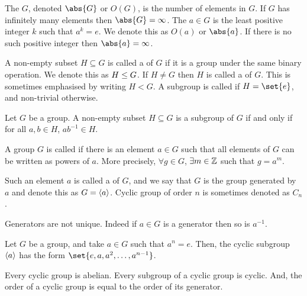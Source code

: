 \documentclass[11pt]{penrose}
\begin{document}
\begin{ndfn}
    The  $G$, denoted $\abs{G}$ or $O(G)$, is the number of elements in $G$. If $G$ has infinitely many elements then $\abs{G} = \infty$. The  $a \in G$ is the least positive integer $k$ such that $a^k = e$. We denote this as $O(a)$ or $\abs{a}$. If there is no such positive integer then $\abs{a} = \infty$.
\end{ndfn}

\begin{ndfn}
    A non-empty subset $H \subseteq G$ is called a  of $G$ if it is a group under the same binary operation. We denote this as $H \mathrel{\leq} G$. If $H \neq G$ then $H$ is called a  of $G$. This is sometimes emphasised by writing $H < G$. A subgroup is called  if $H = \set{e}$, and non-trivial otherwise.
\end{ndfn}

\begin{nthm}
    Let $G$ be a group. A non-empty subset $H \subseteq G$ is a subgroup of $G$ if and only if for all $a, b \in H$, $ab^{-1} \in H$.
\end{nthm}


\begin{ndfn}
    A group $G$ is called  if there is an element $a \in G$ such that all elements of $G$ can be written as powers of $a$. More precisely, $\forall g \in G$, $\exists m \in \mathbb{Z}$ such that $g = a^m$.

    Such an element $a$ is called a  of $G$, and we say that $G$ is the group generated by $a$ and denote this as $G = \langle a\rangle$. Cyclic group of order $n$ is sometimes denoted as $C_n$.
\end{ndfn}

Generators are not unique. Indeed if $a \in G$ is a generator then so is $a^{-1}$.

\begin{nthm}
    Let $G$ be a group, and take $a \in G$ such that $a^n = e$. Then, the cyclic subgroup $\langle a\rangle$ has the form $\set{e, a, a^2, \dots, a^{n-1}}$.
\end{nthm}

\begin{nthm}
    Every cyclic group is abelian. Every subgroup of a cyclic group is cyclic. And, the order of a cyclic group is equal to the order of its generator.
\end{nthm}
\end{document}
